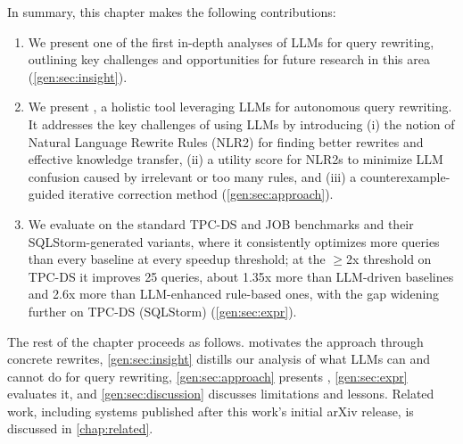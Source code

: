 In summary, this chapter makes the following contributions:
\begin{enumerate}[leftmargin=0.5cm]
\item We present one of the first in-depth analyses of LLMs for query
rewriting, outlining key challenges and opportunities for future
research in this area (\cref{gen:sec:insight}).
\item We present \genrewrite, a holistic tool leveraging LLMs for
autonomous query rewriting. It addresses the key challenges of using
LLMs by introducing (i) the notion of Natural Language Rewrite Rules
(NLR2) for finding better rewrites and effective knowledge transfer,
(ii) a utility score for NLR2s to minimize LLM confusion caused by
irrelevant or too many rules, and (iii) a counterexample-guided
iterative correction method (\cref{gen:sec:approach}).
\item We evaluate \genrewrite on the standard TPC-DS and JOB
benchmarks and their SQLStorm-generated variants, where it
consistently optimizes more queries than every baseline at every
speedup threshold; at the $\geq$2x threshold on TPC-DS it improves 25
queries, about 1.35x more than LLM-driven baselines and 2.6x more than
LLM-enhanced rule-based ones, with the gap widening further on TPC-DS
(SQLStorm) (\cref{gen:sec:expr}).
\end{enumerate}

The rest of the chapter proceeds as follows.
 motivates the approach through concrete
rewrites, \cref{gen:sec:insight} distills our analysis of what LLMs
can and cannot do for query rewriting, \cref{gen:sec:approach}
presents \genrewrite, \cref{gen:sec:expr} evaluates it, and
\cref{gen:sec:discussion} discusses limitations and lessons. Related
work, including systems published after this work's initial arXiv
release, is discussed in \cref{chap:related}.
